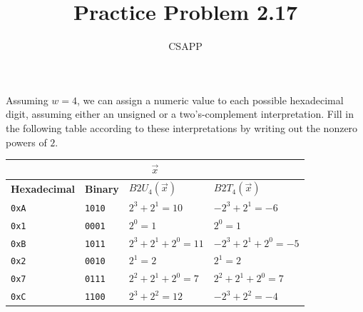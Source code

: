 \documentclass{article}
\title{Practice Problem 2.17}
\author{CSAPP}
\begin{document}
\maketitle

Assuming $w = 4$, we can assign a numeric value to each possible hexadecimal digit, assuming either an unsigned or a two's-complement interpretation. Fill in the following table according to these interpretations by writing out the nonzero powers of $2$.

\begin{table}[h]
\centering
\begin{tabular}{|l|l|l|l|}
    \hline
    \multicolumn{4}{|c|}{$\vec{x}$} \\
    \hline
    \textbf{Hexadecimal} & \textbf{Binary} & $B2U_4(\vec{x})$ & $B2T_4(\vec{x})$ \\
    \hline
    \texttt{0xA} & \texttt{1010} & $2^3 + 2^1 = 10$ & $-2^3 + 2^1 = -6$ \\
    \hline
    \texttt{0x1} & \texttt{0001} & $2^0 = 1$ & $2^0 = 1$ \\
    \hline
    \texttt{0xB} & \texttt{1011} & $2^3 + 2^1 + 2^0 = 11$ & $-2^3 + 2^1 + 2^0 = -5$ \\
    \hline
    \texttt{0x2} & \texttt{0010} & $2^1 = 2$ & $2^1 = 2$ \\
    \hline
    \texttt{0x7} & \texttt{0111} & $2^2 + 2^1 + 2^0 = 7$ & $2^2 + 2^1 + 2^0 = 7$ \\
    \hline
    \texttt{0xC} & \texttt{1100} & $2^3 + 2^2 = 12$ & $-2^3 + 2^2 = -4$ \\
    \hline
\end{tabular}
\end{table}
\end{document}
